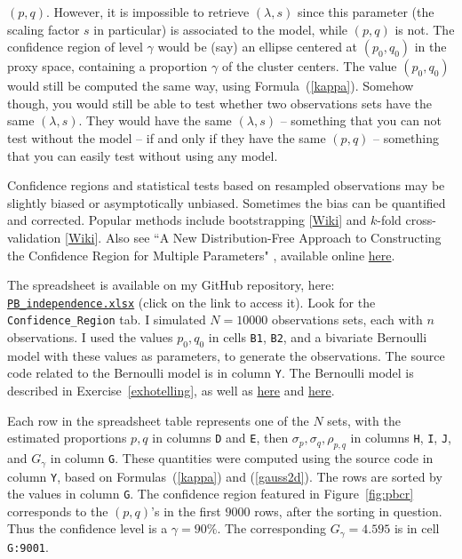 \documentclass[10pt]{article}
\begin{document}
$(p,q)$. However, it is impossible to retrieve $(\lambda,s)$ since this parameter (the scaling factor $s$ in particular) is associated to the model, while $(p,q)$ is not. The confidence region of level $\gamma$ would be (say) an ellipse centered at $(p_0,q_0)$ in the proxy space, containing a proportion $\gamma$ of the cluster centers. The value $(p_0,q_0)$ would still be computed the same way, using Formula~(\ref{kappa}). Somehow though, you would still be able to test whether two observations sets have the same $(\lambda,s)$. They would have the same $(\lambda, s)$
 -- something that you can not test without the model -- if and only if they have the same $(p,q)$ -- something that you can easily test without using any model. 

Confidence regions and statistical tests based on resampled observations may be slightly biased or asymptotically unbiased. Sometimes the bias can be quantified and corrected. Popular methods include 
bootstrapping [\href{https://en.wikipedia.org/wiki/Bootstrapping_(statistics)}{Wiki}] and $k$-fold \textcolor{index}{cross-validation} [\href{https://en.wikipedia.org/wiki/Cross-validation_(statistics)}{Wiki}]. Also see ``A New Distribution-Free Approach to Constructing the Confidence Region for Multiple Parameters" \cite{crmodelfree}, 
available online \href{https://journals.plos.org/plosone/article?id=10.1371/journal.pone.0081179}{here}. 
\quad \\


\noindent The spreadsheet is available on my GitHub repository, here: \href{https://github.com/VincentGranville/Point-Processes/tree/main/Spreadsheets}{\texttt{PB\_independence.xlsx}} (click on the link to access it).  
Look for the
 \texttt{Confidence\_Region} tab. I simulated $N=\num{10000}$ observations sets, each with $n$ observations. I used the values 
 $p_0, q_0$ in cells \texttt{B1}, \texttt{B2}, and a bivariate Bernoulli model with these values as parameters, to generate the observations. The source code related to the
Bernoulli model is in column \texttt{Y}. 
The Bernoulli model is described 
in Exercise~\ref{exhotelling}, as well as \href{https://stats.stackexchange.com/questions/564702/two-possible-definitions-of-confidence-regions-which-one-to-choose}{here} 
and \href{https://www.datasciencecentral.com/model-free-inference-for-machine-learning-professionals/}{here}.

Each row in the spreadsheet table represents  one of the $N$ sets, with the estimated proportions $p,q$ in columns \texttt{D} and \texttt{E}, then 
$\sigma_p,\sigma_q,\rho_{p,q}$ in columns \texttt{H}, \texttt{I}, \texttt{J}, and $G_\gamma$ in column \texttt{G}. These quantities were computed using the source code in column \texttt{Y}, based on Formulas~(\ref{kappa}) and (\ref{gauss2d}).
The rows are sorted by the values in column \texttt{G}. 
 The confidence region featured in Figure~\ref{fig:pbcr} corresponds to the $(p,q)$'s in the first $\num{9000}$ rows, after the sorting in question. Thus  the confidence level is  a $\gamma=90\%$. The corresponding $G_\gamma=4.595$ is in cell \texttt{G:9001}.
\end{document}

